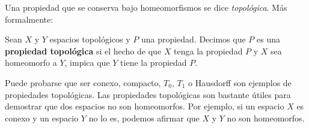 Una propiedad que se conserva bajo homeomorfismos se dice \textit{topológica}. Más formalmente:
\begin{Def}
   Sean $X$ y $Y$ espacios topológicos y $P$ una propiedad. Decimos que $P$ es una \textbf{propiedad topológica} si el hecho de que $X$ tenga la propiedad $P$ y $X$ sea homeomorfo a $Y$, impica que $Y$ tiene la propiedad $P$.
\end{Def}
Puede probarse que ser conexo, compacto, $T_0$, $T_1$ o Hausdorff son ejemplos de propiedades topológicas. Las propiedades topológicas son bastante útiles para demostrar que dos espacios no son homeomorfos. Por ejemplo, si un espacio $X$ es conexo y un espacio $Y$ no lo es, podemos afirmar que $X$ y $Y$ no son homeomorfos.
